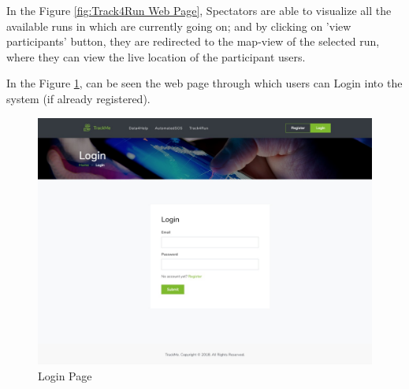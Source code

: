 \documentclass[a4paper, hidelinks, 12pt]{report}
\begin{document}
	In the Figure \ref{fig:Track4Run Web Page}, Spectators are able to visualize all the available runs in which are currently going on; and by clicking on 'view participants' button, they are redirected to the map-view of the selected run, where they can view the live location of the participant users.	
	
	In the Figure \ref{fig:Login}, can be seen the web page through which users can Login into the system (if already registered).
	
	\begin{figure}[H]
		\centering
		\includegraphics[scale=0.25]{UI/UI/9.jpeg}
		\caption[UI: Login Page]{Login Page}
		\label{fig:Login}
	\end{figure}
	
\end{document}
